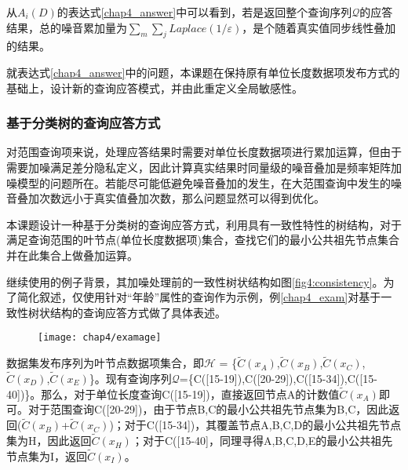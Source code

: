 从$A_{i}(D)$的表达式\ref{chap4_answer}中可以看到，若是返回整个查询序列$\mathcal{Q}$的应答结果，总的噪音累加量为$\sum\limits_m {\sum\limits_j \textit{Laplace}(1/\varepsilon)}$，是个随着真实值同步线性叠加的结果。

就表达式\ref{chap4_answer}中的问题，本课题在保持原有单位长度数据项发布方式的基础上，设计新的查询应答模式，并由此重定义全局敏感性。

\subsubsection{基于分类树的查询应答方式}
对范围查询项来说，处理应答结果时需要对单位长度数据项进行累加运算，但由于需要加噪满足差分隐私定义，因此计算真实结果时同量级的噪音叠加是频率矩阵加噪模型的问题所在。若能尽可能低避免噪音叠加的发生，在大范围查询中发生的噪音叠加次数远小于真实值叠加次数，那么问题显然可以得到优化。

本课题设计一种基于分类树的查询应答方式，利用具有一致性特性的树结构，对于满足查询范围的叶节点(单位长度数据项)集合，查找它们的最小公共祖先节点集合并在此集合上做叠加运算。

继续使用\label{chap3_exmp}的例子背景，其加噪处理前的一致性树状结构如图\ref{fig4:consistency}。为了简化叙述，仅使用针对“年龄”属性的查询作为示例，例\ref{chap4_exam}对基于一致性树状结构的查询应答方式做了具体表述。

\begin{figure}[!htp]
	\centering
	\texttt{[image: chap4/examage]}
\end{figure}

\begin{exmp}
	\label{chap4_exam}
数据集发布序列为叶节点数据项集合，即$\mathcal{H}$ = \{$\widetilde{C}(x_{A})$,$\widetilde{C}(x_{B})$,$\widetilde{C}(x_{C})$,$\widetilde{C}(x_{D})$,$\widetilde{C}(x_{E})$\}。现有查询序列$\mathcal{Q}$=\{C([15-19]),C([20-29]),C([15-34]),C([15-40])\}。那么，对于单位长度查询C([15-19])，直接返回节点A的计数值$\widetilde{C}(x_{A})$即可。对于范围查询C([20-29])，由于节点B,C的最小公共祖先节点集为{B,C}，因此返回($\widetilde{C}(x_{B})$+$\widetilde{C}(x_{C})$)；对于C([15-34])，其覆盖节点A,B,C,D的最小公共祖先节点集为{H}，因此返回$\widetilde{C}(x_{H})$；对于C([15-40]，同理寻得A,B,C,D,E的最小公共祖先节点集为{I}，返回$\widetilde{C}(x_{I})$。
\end{exmp}

